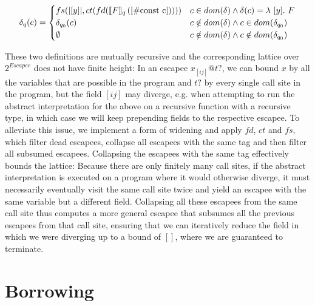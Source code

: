 \begin{alignat*}{3}
	\delta_q(c) = \begin{cases}
		fs(|[y]|, ct(fd(\llbracket {F} \rrbracket_q \left( {[\#\text{const c}]} \right)))) & c \in dom(\delta) \land \delta(c) = \lambda\ [y].\ F \\
		\delta_{q_0}(c) & c \notin dom(\delta) \land c \in dom(\delta_{q_0}) \\
		\emptyset & c \notin dom(\delta) \land c \notin dom(\delta_{q_0})
	\end{cases}
\end{alignat*}

These two definitions are mutually recursive and the corresponding lattice over $2^{Escapee}$ does not have finite height: In an escapee $x_{[ij]} @ t?$, we can bound $x$ by all the variables that are possible in the program and $t?$ by every single call site in the program, but the field $[ij]$ may diverge, e.g. when attempting to run the abstract interpretation for the above on a recursive function with a recursive type, in which case we will keep prepending fields to the respective escapee. To alleviate this issue, we implement a form of widening and apply $fd$, $ct$ and $fs$, which filter dead escapees, collapse all escapees with the same tag and then filter all subsumed escapees. Collapsing the escapees with the same tag effectively bounds the lattice: Because there are only finitely many call sites, if the abstract interpretation is executed on a program where it would otherwise diverge, it must necessarily eventually visit the same call site twice and yield an escapee with the same variable but a different field. Collapsing all these escapees from the same call site thus computes a more general escapee that subsumes all the previous escapees from that call site, ensuring that we can iteratively reduce the field in which we were diverging up to a bound of $[]$, where we are guaranteed to terminate.

\section{Borrowing}

